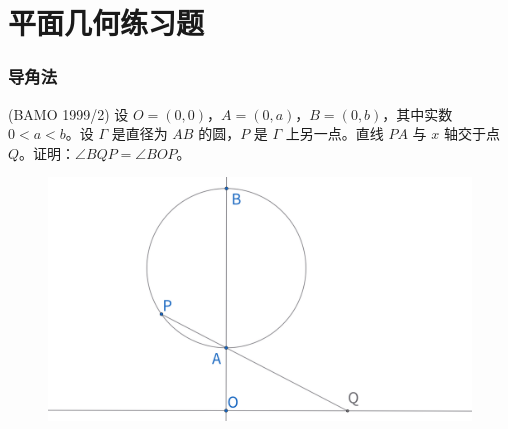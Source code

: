 \part{平面几何练习题}
\section{导角法}



\newpage 
\begin{exercise}
(BAMO 1999/2) 设 $O = (0, 0)$，$A = (0, a)$，$B = (0, b)$，其中实数 $0 < a < b$。设 $\Gamma$ 是直径为 ${AB}$ 的圆，$P$ 是 $\Gamma$ 上另一点。直线 $PA$ 与 $x$ 轴交于点 $Q$。证明：$\angle BQP = \angle BOP$。
\end{exercise}
\begin{figure}[H]
    \centering
    \includegraphics[width=0.7\linewidth]{figures/exercises/003.png}
\end{figure}


